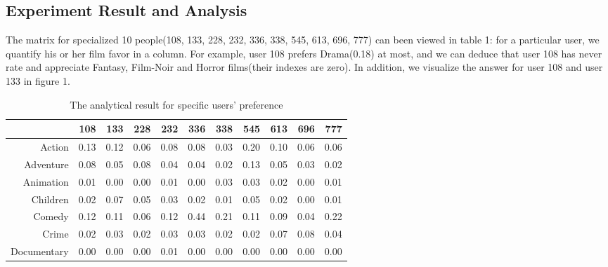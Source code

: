 \subsection{Experiment Result and Analysis}
The matrix for specialized 10 people(108, 133, 228, 232, 336, 338, 545, 613, 696, 777) can been viewed in table 1: for a particular user, we quantify his or her film favor in a column. For example, user 108 prefers Drama(0.18) at most, and we can deduce that user 108 has never rate and appreciate Fantasy, Film-Noir and Horror films(their indexes are zero). In addition, we visualize the answer for user 108 and user 133 in figure 1.
\begin{table}
\caption{The analytical result for specific users' preference} 
\begin{tabular}{rrrrrrrrrrr}

           &        108 &        133 &        228 &        232 &        336 &        338 &        545 &        613 &        696 &        777  \\  \hline

    Action &      0.13  &      0.12  &      0.06  &      0.08  &      0.08  &      0.03  &      0.20  &      0.10  &      0.06  &      0.06  \\

 Adventure &      0.08  &      0.05  &      0.08  &      0.04  &      0.04  &      0.02  &      0.13  &      0.05  &      0.03  &      0.02  \\

 Animation &      0.01  &      0.00  &      0.00  &      0.01  &      0.00  &      0.03  &      0.03  &      0.02  &      0.00  &      0.01  \\

  Children &      0.02  &      0.07  &      0.05  &      0.03  &      0.02  &      0.01  &      0.05  &      0.02  &      0.00  &      0.01  \\

    Comedy &      0.12  &      0.11  &      0.06  &      0.12  &      0.44  &      0.21  &      0.11  &      0.09  &      0.04  &      0.22  \\

     Crime &      0.02  &      0.03  &      0.02  &      0.03  &      0.03  &      0.02  &      0.02  &      0.07  &      0.08  &      0.04  \\

Documentary &      0.00  &      0.00  &      0.00  &      0.01  &      0.00  &      0.00  &      0.00  &      0.00  &      0.00  &      0.00  \\


\end{tabular}
\end{table}
